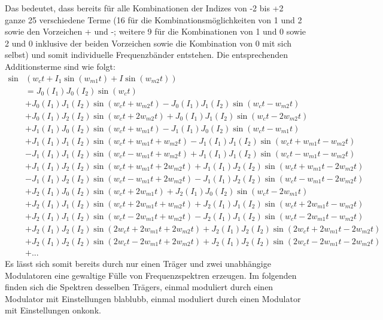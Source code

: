 Das bedeutet, dass bereits für alle Kombinationen der Indizes von -2 bis +2 ganze 25 verschiedene Terme (16 für die Kombinationsmöglichkeiten von 1 und 2 sowie den Vorzeichen + und -; weitere 9 für die Kombinationen von 1 und 0 sowie 2 und 0 inklusive der beiden Vorzeichen sowie die Kombination von 0 mit sich selbst) und somit individuelle Frequenzbänder entstehen. Die entsprechenden Additionsterme sind wie folgt:
\begin{equation}
\begin{split}
\sin&(w_ct + I_1\sin(w_{m1}t) + I\sin(w_{m2}t)) \\
&= J_0(I_1)J_0(I_2)\sin(w_ct) \\
&+ J_0(I_1)J_1(I_2)\sin(w_ct + w_{m2}t) - J_0(I_1)J_1(I_2)\sin(w_ct - w_{m2}t) \\
&+ J_0(I_1)J_2(I_2)\sin(w_ct + 2w_{m2}t) + J_0(I_1)J_1(I_2)\sin(w_ct - 2w_{m2}t) \\
&+ J_1(I_1)J_0(I_2)\sin(w_ct + w_{m1}t) - J_1(I_1)J_0(I_2)\sin(w_ct - w_{m1}t) \\
&+ J_1(I_1)J_1(I_2)\sin(w_ct + w_{m1}t + w_{m2}t) - J_1(I_1)J_1(I_2)\sin(w_ct + w_{m1}t - w_{m2}t) \\
&- J_1(I_1)J_1(I_2)\sin(w_ct - w_{m1}t + w_{m2}t) + J_1(I_1)J_1(I_2)\sin(w_ct - w_{m1}t - w_{m2}t) \\
&+ J_1(I_1)J_2(I_2)\sin(w_ct + w_{m1}t + 2w_{m2}t) + J_1(I_1)J_2(I_2)\sin(w_ct + w_{m1}t - 2w_{m2}t) \\
&- J_1(I_1)J_2(I_2)\sin(w_ct - w_{m1}t + 2w_{m2}t) - J_1(I_1)J_2(I_2)\sin(w_ct - w_{m1}t - 2w_{m2}t) \\
&+ J_2(I_1)J_0(I_2)\sin(w_ct + 2w_{m1}t) + J_2(I_1)J_0(I_2)\sin(w_ct - 2w_{m1}t) \\
&+ J_2(I_1)J_1(I_2)\sin(w_ct + 2w_{m1}t + w_{m2}t) + J_2(I_1)J_1(I_2)\sin(w_ct + 2w_{m1}t - w_{m2}t) \\
&+ J_2(I_1)J_1(I_2)\sin(w_ct - 2w_{m1}t + w_{m2}t) - J_2(I_1)J_1(I_2)\sin(w_ct - 2w_{m1}t - w_{m2}t) \\
&+ J_2(I_1)J_2(I_2)\sin(2w_ct + 2w_{m1}t + 2w_{m2}t) + J_2(I_1)J_2(I_2)\sin(2w_ct + 2w_{m1}t - 2w_{m2}t) \\
&+ J_2(I_1)J_2(I_2)\sin(2w_ct - 2w_{m1}t + 2w_{m2}t) + J_2(I_1)J_2(I_2)\sin(2w_ct - 2w_{m1}t - 2w_{m2}t) \\
&+ ... 
\end{split}
\end{equation}
Es lässt sich somit bereits durch nur einen Träger und zwei unabhängige Modulatoren eine gewaltige Fülle von Frequenzspektren erzeugen. Im folgenden finden sich die Spektren desselben Trägers, einmal moduliert durch einen Modulator mit Einstellungen blablubb,
einmal moduliert durch einen Modulator mit Einstellungen onkonk.

